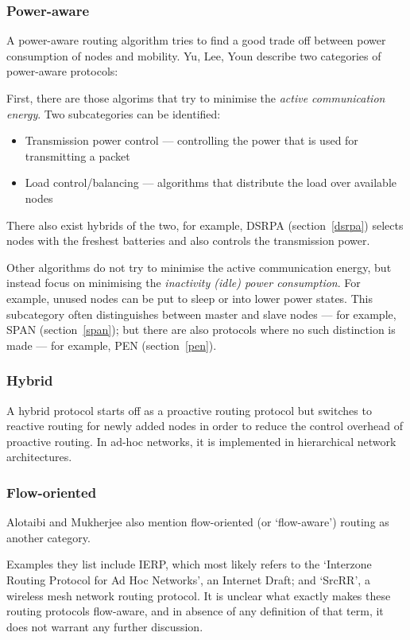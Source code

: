 \subsubsection*{Power-aware}
A power-aware routing algorithm tries to find a good trade off between
power consumption of nodes and mobility. Yu, Lee, Youn\cite{main1} describe two categories
of power-aware protocols:

First, there are those algorims that try to minimise the \textit{active communication energy}. Two
subcategories can be identified:
\begin{itemize}
    \item Transmission power control --- controlling the power that is used for transmitting a packet
    \item Load control/balancing --- algorithms that distribute the load over available nodes
\end{itemize}
There also exist hybrids of the two, for example, DSRPA (section~\ref{dsrpa})
selects nodes with the freshest batteries and also controls the transmission
power.

Other algorithms do not try to minimise the active communication energy, but
instead focus on minimising the  \textit{inactivity (idle) power consumption}. For example, unused
nodes can be put to sleep or into lower power states. This subcategory often
distinguishes between master and slave nodes --- for example, SPAN (section~\ref{span}); but there are also protocols
where no such distinction is made --- for example, PEN (section~\ref{pen}).

\subsubsection*{Hybrid}
A hybrid protocol starts off as a proactive routing protocol but switches
to reactive routing for newly added nodes in order to reduce the control
overhead of proactive routing. In ad-hoc networks, it is implemented in
hierarchical network architectures.

\subsubsection*{Flow-oriented}
Alotaibi and Mukherjee\cite{alotaibi2012survey} also mention flow-oriented (or `flow-aware')
routing as another category.

Examples they list include
IERP, which most likely refers to the `Interzone Routing Protocol for Ad Hoc Networks', an Internet Draft\cite{manet-zone-ierp-02};
and `SrcRR'\cite{aguayo2005srcrr}, a wireless mesh network routing protocol. It is unclear what exactly
makes these routing protocols flow-aware, and in absence of any definition of
that term, it does not warrant any further discussion. 

